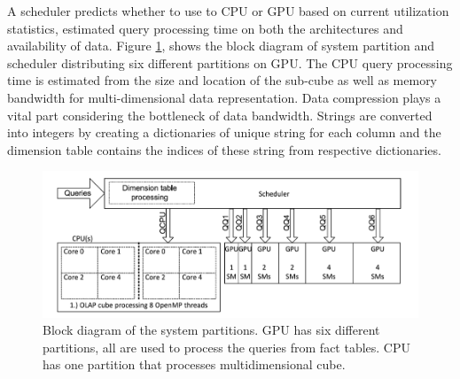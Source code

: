 \documentclass[runningheads,a4paper]{llncs}
\begin{document}
{A scheduler predicts whether to use to CPU or GPU based on current utilization statistics, estimated query processing time on both the architectures and availability of data. Figure \ref{fig:krunal6}, shows the block diagram of system partition and scheduler distributing six different partitions on GPU. The CPU query processing time is estimated from the size and location of the sub-cube as well as memory bandwidth for multi-dimensional data representation. Data compression plays a vital part considering the bottleneck of data bandwidth. Strings are converted into integers by creating a dictionaries of unique string for each column and the dimension table contains the indices of these string from respective dictionaries.
\begin{figure}[!htb]
	\includegraphics[scale=0.7]{./images/krunal6}
	\centering
	\caption{Block diagram of the system partitions. GPU has six different partitions, all are used to process the queries from fact tables. CPU has one partition that processes multidimensional cube.}
	\label{fig:krunal6}
\end{figure}

\newpage
}
\end{document}
